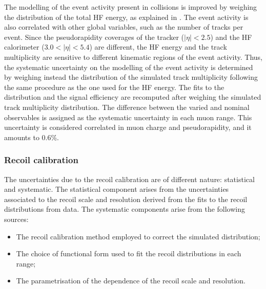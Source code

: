 The modelling of the event activity present in \RunpPb collisions is improved by weighing the distribution of the total HF energy, as explained in . The event activity is also correlated with other global variables, such as the number of tracks per event.
Since the pseudorapidity coverages of the tracker ($|\eta| < 2.5$) and the HF calorimeter ($3.0 < |\eta| < 5.4$) are different, the HF energy and the track multiplicity are sensitive to different kinematic regions of the event activity. Thus, the systematic uncertainty on the modelling of the event activity is determined by weighing instead the distribution of the simulated track multiplicity following the same procedure as the one used for the HF energy. The fits to the \ptmiss distribution and the signal efficiency are recomputed after weighing the simulated track multiplicity distribution. The difference between the varied and nominal observables is assigned as the systematic uncertainty in each muon \etaMuCM range. This uncertainty is considered correlated in muon charge and pseudorapidity, and it amounts to 0.6\%.

\subsubsection{Recoil calibration}

The uncertainties due to the recoil calibration are of different nature: statistical and systematic. The statistical component arises from the uncertainties associated to the recoil scale and resolution derived from the fits to the recoil distributions from data. The systematic components arise from the following sources:
\begin{itemize}
 \item The recoil calibration method employed to correct the simulated \ptmiss distribution;
 \item The choice of functional form used to fit the recoil distributions in each \qtZ range;
 \item The parametrisation of the \qt dependence of the recoil scale and resolution.
\end{itemize}


